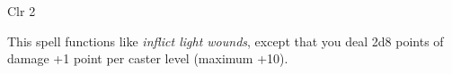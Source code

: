 
\begin{description*}
\item[Level:] Clr 2
\end{description*}

This spell functions like \textit{inflict light wounds}, except that you deal 2d8
points of damage +1 point per caster level (maximum +10).